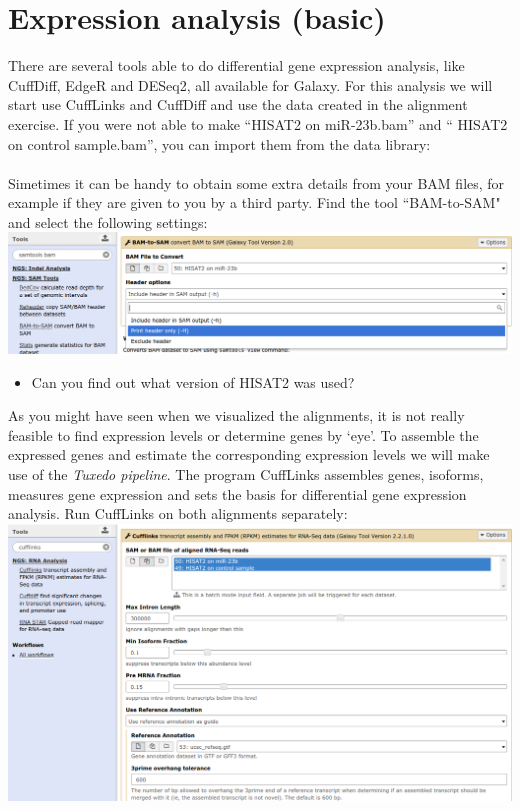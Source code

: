 \documentclass[11pt,a4paper]{article}
\begin{document}


\section{Expression analysis (basic)}
There are several tools able to do differential gene expression analysis, like CuffDiff, EdgeR and DESeq2, all available for Galaxy. For this analysis we will start use CuffLinks and CuffDiff and use the data created in the alignment exercise. If you were not able to make ``HISAT2 on miR-23b.bam'' and `` HISAT2 on control sample.bam'', you can import them from the data library:\\
\datalibrarydirrnaseqtuxedo \\
Simetimes it can be handy to obtain some extra details from your BAM files, for example if they are given to you by a third party. Find the tool ``BAM-to-SAM" and select the following settings:\\
\includegraphics[width=\textwidth]{figures/basic_01.png}\\
\begin{itemize}
	\item Can you find out what version of HISAT2 was used?
\end{itemize}
As you might have seen when we visualized the alignments, it is not really feasible to find expression levels or determine genes by `eye'. To assemble the expressed genes and estimate the corresponding expression levels we will make use of the \textit{Tuxedo pipeline}. The program CuffLinks assembles genes, isoforms, measures gene expression and sets the basis for differential gene expression analysis. Run CuffLinks on both alignments separately:\\
\includegraphics[width=\textwidth]{figures/basic_02a.png}\\
\end{document}
